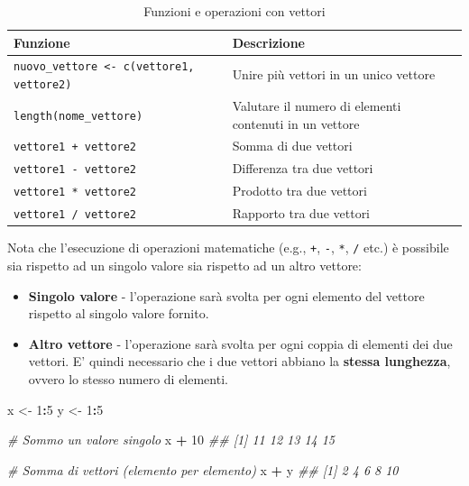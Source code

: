 \documentclass[
]{book}
\newenvironment{Shaded}{\begin{snugshade}}{\end{snugshade}}
\newcommand{\CommentTok}[1]{\textcolor[rgb]{0.56,0.35,0.01}{\textit{#1}}}
\newcommand{\DecValTok}[1]{\textcolor[rgb]{0.00,0.00,0.81}{#1}}
\newcommand{\NormalTok}[1]{#1}
\newcommand{\OperatorTok}[1]{\textcolor[rgb]{0.81,0.36,0.00}{\textbf{#1}}}
\newcommand{\StringTok}[1]{\textcolor[rgb]{0.31,0.60,0.02}{#1}}
\providecommand{\tightlist}{%
  \setlength{\itemsep}{0pt}\setlength{\parskip}{0pt}}
\begin{document}
\begin{table}[!h]

\caption{\label{tab:table-vector-operators}Funzioni e  operazioni con vettori}
\centering
\begin{tabular}[t]{l|l}
\hline
Funzione & Descrizione\\
\hline
\texttt{nuovo\_vettore <- c(vettore1, vettore2)} & Unire più vettori in un unico vettore\\
\hline
\texttt{length(nome\_vettore)} & Valutare il numero di elementi contenuti in un vettore\\
\hline
\texttt{vettore1 + vettore2} & Somma di due vettori\\
\hline
\texttt{vettore1 - vettore2} & Differenza tra due vettori\\
\hline
\texttt{vettore1 * vettore2} & Prodotto tra due vettori\\
\hline
\texttt{vettore1 / vettore2} & Rapporto tra due vettori\\
\hline
\end{tabular}
\end{table}

Nota che l'esecuzione di operazioni matematiche (e.g., \texttt{+}, \texttt{-}, \texttt{*}, \texttt{/} etc.) è possibile sia rispetto ad un singolo valore sia rispetto ad un altro vettore:

\begin{itemize}
\tightlist
\item
  \textbf{Singolo valore} - l'operazione sarà svolta per ogni elemento del vettore rispetto al singolo valore fornito.
\item
  \textbf{Altro vettore} - l'operazione sarà svolta per ogni coppia di elementi dei due vettori. E' quindi necessario che i due vettori abbiano la \textbf{stessa lunghezza}, ovvero lo stesso numero di elementi.
\end{itemize}

\begin{Shaded}
\begin{Highlighting}[]
\NormalTok{x <-}\StringTok{ }\DecValTok{1}\OperatorTok{:}\DecValTok{5}
\NormalTok{y <-}\StringTok{ }\DecValTok{1}\OperatorTok{:}\DecValTok{5}

\CommentTok{# Sommo un valore singolo}
\NormalTok{x }\OperatorTok{+}\StringTok{ }\DecValTok{10}
\CommentTok{## [1] 11 12 13 14 15}

\CommentTok{# Somma di vettori (elemento per elemento)}
\NormalTok{x }\OperatorTok{+}\StringTok{ }\NormalTok{y}
\CommentTok{## [1]  2  4  6  8 10}
\end{Highlighting}
\end{Shaded}
\end{document}
